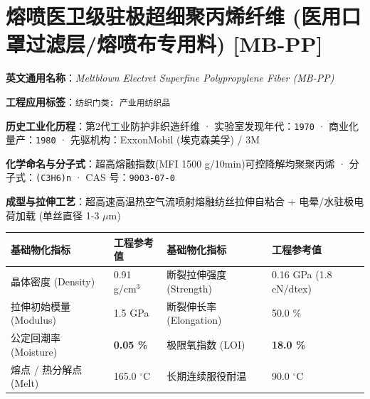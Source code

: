\documentclass[11pt,openright,twoside,UTF8]{ctexbook}
\begin{document}
\section{熔喷医卫级驻极超细聚丙烯纤维 (医用口罩过滤层/熔喷布专用料) [MB-PP]}
\label{sec:mb-pp}

\noindent\textbf{英文通用名称}：\textit{Meltblown Electret Superfine Polypropylene Fiber (MB-PP)}\par
\noindent\textbf{工程应用标签}：\texttt{纺织门类: 产业用纺织品}\par
\noindent\textbf{历史工业化历程}：第2代工业防护非织造纤维 · 实验室发现年代：\texttt{1970} · 商业化量产：\texttt{1980} · 先驱机构：ExxonMobil (埃克森美孚) / 3M\par
\noindent\textbf{化学命名与分子式}：超高熔融指数(MFI 1500 g/10min)可控降解均聚聚丙烯 · 分子式：\texttt{(C3H6)n} · CAS 号：\texttt{9003-07-0}\par
\noindent\textbf{成型与拉伸工艺}：超高速高温热空气流喷射熔融纺丝拉伸自粘合 + 电晕/水驻极电荷加载 (单丝直径 1-3 $\mu$m)\par

\vspace{0.15cm}
\begin{center}
\small
\begin{tabularx}{\textwidth}{p{3.8cm}Xp{3.8cm}X}
\toprule
\textbf{基础物化指标} & \textbf{工程参考值} & \textbf{基础物化指标} & \textbf{工程参考值} \\
\midrule
晶体密度 (Density) & 0.91 g/cm$^3$ & 断裂拉伸强度 (Strength) & 0.16 GPa (1.8 cN/dtex) \\
拉伸初始模量 (Modulus) & 1.5 GPa & 断裂伸长率 (Elongation) & 50.0 \% \\
公定回潮率 (Moisture) & \textbf{0.05 \%} & 极限氧指数 (LOI) & \textbf{18.0 \%} \\
熔点 / 热分解点 (Melt) & 165.0 $^\circ\mathrm{C}$ & 长期连续服役耐温 & 90.0 $^\circ\mathrm{C}$ \\
\bottomrule
\end{tabularx}
\end{center}
\vspace{0.15cm}
\end{document}
